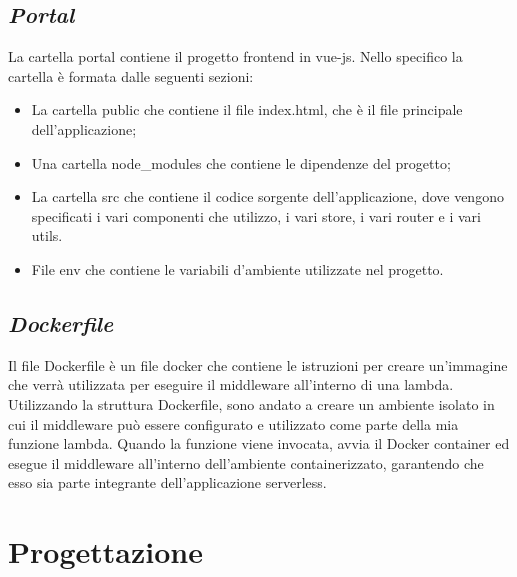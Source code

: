 \subsection*{\emph{Portal}}
La cartella portal contiene il progetto frontend in vue-js. Nello specifico la cartella è formata dalle seguenti sezioni:
\begin{itemize}
  \item La cartella public che contiene il file index.html, che è il file principale dell'applicazione;
  \item Una cartella node\_modules che contiene le dipendenze del progetto;
  \item La cartella src che contiene il codice sorgente dell'applicazione, dove vengono specificati i vari componenti che utilizzo, i vari store, i vari router e i vari utils.
  \item File env che contiene le variabili d'ambiente utilizzate nel progetto.
\end{itemize}

\subsection*{\emph{Dockerfile}}
Il file Dockerfile è un file docker che contiene le istruzioni per creare un'immagine che verrà utilizzata per eseguire il middleware all'interno di una lambda.\\
Utilizzando la struttura Dockerfile, sono andato a creare un ambiente isolato in cui il middleware può essere configurato e utilizzato come parte della mia funzione 
lambda. Quando la funzione viene invocata, avvia il Docker container ed esegue il middleware all'interno dell'ambiente containerizzato, 
garantendo che esso sia parte integrante dell'applicazione serverless.


\section{Progettazione}\label{sec:progettazione}

